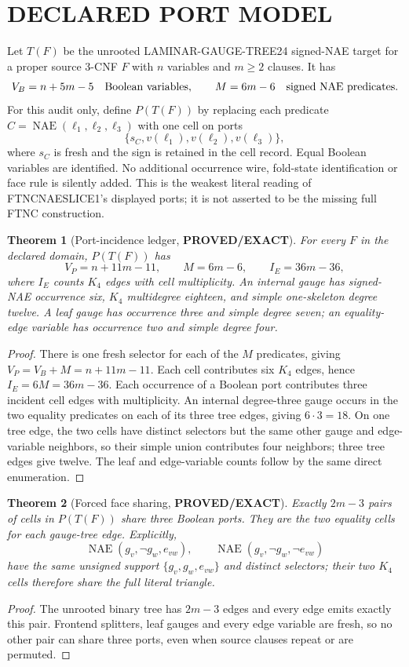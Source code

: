 \documentclass[11pt]{article}
\newtheorem{theorem}{Theorem}
\newcommand{\EXACT}{\textbf{PROVED/EXACT}}
\begin{document}
\section{DECLARED PORT MODEL}
Let $T(F)$ be the unrooted LAMINAR-GAUGE-TREE24 signed-NAE target for a proper
source 3-CNF $F$ with $n$ variables and $m\ge2$ clauses.  It has
\[
 V_B=n+5m-5\quad\hbox{Boolean variables},\qquad
 M=6m-6\quad\hbox{signed NAE predicates}.
\]
For this audit only, define $P(T(F))$ by replacing each predicate
$C=\operatorname{NAE}(\ell_1,\ell_2,\ell_3)$ with one cell on ports
\[
 \{s_C,v(\ell_1),v(\ell_2),v(\ell_3)\},
\]
where $s_C$ is fresh and the sign is retained in the cell record.  Equal
Boolean variables are identified.  No additional occurrence wire, fold-state
identification or face rule is silently added.  This is the weakest literal
reading of FTNCNAESLICE1's displayed ports; it is not asserted to be the
missing full FTNC construction.

\begin{theorem}[Port-incidence ledger, \EXACT]
For every $F$ in the declared domain, $P(T(F))$ has
\[
 \boxed{V_P=n+11m-11},\qquad
 \boxed{M=6m-6},\qquad
 \boxed{I_E=36m-36},
\]
where $I_E$ counts $K_4$ edges with cell multiplicity.  An internal gauge has
signed-NAE occurrence six, $K_4$ multidegree eighteen, and simple one-skeleton
degree twelve.  A leaf gauge has occurrence three and simple degree seven;
an equality-edge variable has occurrence two and simple degree four.
\end{theorem}
\begin{proof}
There is one fresh selector for each of the $M$ predicates, giving
$V_P=V_B+M=n+11m-11$.  Each cell contributes six $K_4$ edges, hence
$I_E=6M=36m-36$.  Each occurrence of a Boolean port contributes three incident
cell edges with multiplicity.  An internal degree-three gauge occurs in the
two equality predicates on each of its three tree edges, giving $6\cdot3=18$.
On one tree edge, the two cells have distinct selectors but the same other
gauge and edge-variable neighbors, so their simple union contributes four
neighbors; three tree edges give twelve.  The leaf and edge-variable counts
follow by the same direct enumeration.
\end{proof}

\begin{theorem}[Forced face sharing, \EXACT]
Exactly $2m-3$ pairs of cells in $P(T(F))$ share three Boolean ports.  They are
the two equality cells for each gauge-tree edge.  Explicitly,
\[
 \operatorname{NAE}(g_v,\neg g_w,e_{vw}),\qquad
 \operatorname{NAE}(g_v,\neg g_w,\neg e_{vw})
\]
have the same unsigned support $\{g_v,g_w,e_{vw}\}$ and distinct selectors;
their two $K_4$ cells therefore share the full literal triangle.
\end{theorem}
\begin{proof}
The unrooted binary tree has $2m-3$ edges and every edge emits exactly this
pair.  Frontend splitters, leaf gauges and every edge variable are fresh, so
no other pair can share three ports, even when source clauses repeat or are
permuted.
\end{proof}
\end{document}
